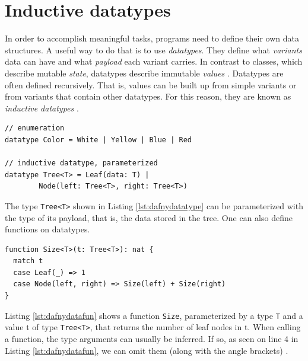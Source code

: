 \documentclass[a4paper]{article}
\begin{document}
\section{Inductive datatypes}
In order to accomplish meaningful tasks, programs need to define their own data structures. A useful way to do that
is to use \textit{datatypes}. They define what \textit{variants} data can have and what \textit{payload} each variant
carries. In contrast to classes, which describe mutable \textit{state}, datatypes describe immutable \textit{values}
\cite{leino2023program}. Datatypes are often defined recursively. That is, values can be built up from simple
variants or from variants that contain other datatypes. For this reason, they are known as \textit{inductive datatypes}
\cite{leino2023program}.
\begin{lstlisting}[style=dafnystyle, caption={A simple and an inductive datatype.}, label={lst:dafnydatatype}]
// enumeration
datatype Color = White | Yellow | Blue | Red

// inductive datatype, parameterized
datatype Tree<T> = Leaf(data: T) | 
		Node(left: Tree<T>, right: Tree<T>)
\end{lstlisting}
The type \texttt{Tree<T>} shown in Listing \ref{lst:dafnydatatype} can be parameterized with the type of its payload,
that is, the data stored in the tree. One can also define functions on datatypes.
\begin{lstlisting}[style=dafnystyle, caption={Function defined on a datatype.}, label={lst:dafnydatafun}]
function Size<T>(t: Tree<T>): nat {
  match t
  case Leaf(_) => 1
  case Node(left, right) => Size(left) + Size(right)
}
\end{lstlisting}
Listing \ref{lst:dafnydatafun} shows a function \texttt{Size}, parameterized by a type \texttt{T} and a value t of type
\texttt{Tree<T>}, that returns the number of leaf nodes in t. When calling a function, the type arguments can
usually be inferred. If so, as seen on line 4 in Listing \ref{lst:dafnydatafun}, we can omit them
(along with the angle brackets) \cite{leino2023program}.
\end{document}

